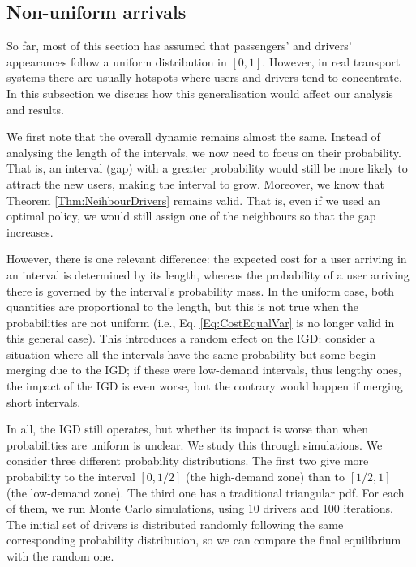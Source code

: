 \documentclass[12pt,english]{article}
\begin{document}
{

\subsection{Non-uniform arrivals}
So far, most of this section has assumed that passengers' and drivers' appearances follow a uniform distribution in $[0,1]$. However, in real transport systems there are usually hotspots where users and drivers tend to concentrate. In this subsection we discuss how this generalisation would affect our analysis and results. 

We first note that the overall dynamic remains almost the same. Instead of analysing the length of the intervals, we now need to focus on their probability. That is, an interval (gap) with a greater probability would still be more likely to attract the new users, making the interval to grow. Moreover, we know that Theorem \ref{Thm:NeihbourDrivers} remains valid. That is, even if we used an optimal policy, we would still assign one of the neighbours so that the gap increases. 

However, there is one relevant difference: the expected cost for a user arriving in an interval is determined by its length, whereas the probability of a user arriving there is governed by the interval's probability mass. In the uniform case, both quantities are proportional to the length, but this is not true when the probabilities are not uniform (i.e., Eq. \ref{Eq:CostEqualVar} is no longer valid in this general case). This introduces a random effect on the IGD: consider a situation where all the intervals have the same probability but some begin merging due to the IGD; if these were low-demand intervals, thus lengthy ones, the impact of the IGD is even worse, but the contrary would happen if merging short intervals.  

In all, the IGD still operates, but whether its impact is worse than when probabilities are uniform is unclear. We study this through simulations. We consider three different probability distributions. The first two give more probability to the interval $[0,1/2]$ (the high-demand zone) than to $[1/2,1]$ (the low-demand zone). The third one has a traditional triangular pdf. For each of them, we run Monte Carlo simulations, using 10 drivers and 100 iterations. The initial set of drivers is distributed randomly following the same corresponding probability distribution, so we can compare the final equilibrium with the random one. 

}
\end{document}
